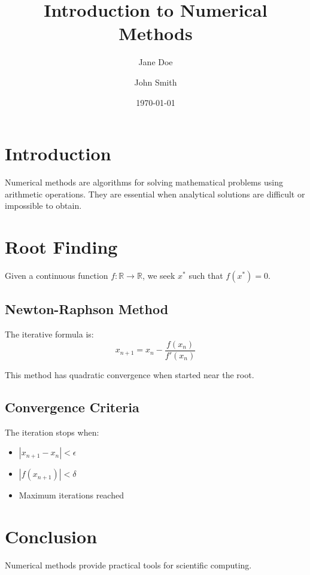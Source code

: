 \documentclass[12pt,a4paper]{article}
\title{Introduction to Numerical Methods}
\author{Jane Doe \and John Smith}
\date{\today}
\begin{document}
\maketitle
\tableofcontents

\section{Introduction}
Numerical methods are algorithms for solving mathematical problems
using arithmetic operations. They are essential when analytical
solutions are difficult or impossible to obtain.

\section{Root Finding}
Given a continuous function $f: \mathbb{R} \rightarrow \mathbb{R}$,
we seek $x^*$ such that $f(x^*) = 0$.

\subsection{Newton-Raphson Method}
The iterative formula is:
\begin{equation}
  x_{n+1} = x_n - \frac{f(x_n)}{f'(x_n)}
\end{equation}

This method has quadratic convergence when started near the root.

\subsection{Convergence Criteria}
The iteration stops when:
\begin{itemize}
  \item $|x_{n+1} - x_n| < \epsilon$
  \item $|f(x_{n+1})| < \delta$
  \item Maximum iterations reached
\end{itemize}

\section{Conclusion}
Numerical methods provide practical tools for scientific computing.
\end{document}
